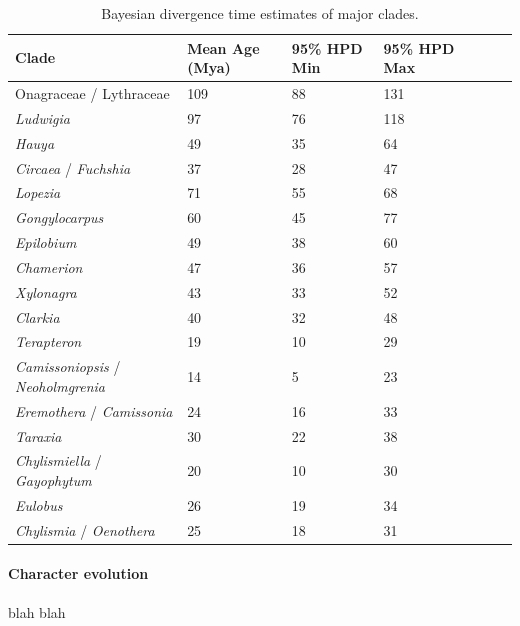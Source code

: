 \documentclass[review]{elsarticle}
\begin{document}
\begin{table}
   \center
   \begin{adjustbox}{max width=\textwidth}
      \begin{tabular}{lllllll}
         \toprule
         Clade & Mean Age (Mya) & 95\% HPD Min & 95\% HPD Max \\ 
	 \midrule
         Onagraceae / Lythraceae & 109 & 88 & 131 \\
         \textit{Ludwigia} & 97 & 76 & 118 \\
	 \textit{Hauya} & 49 & 35 & 64 \\
	 \textit{Circaea} / \textit{Fuchshia} & 37 & 28 & 47 \\
	 \textit{Lopezia} & 71 & 55 & 68 \\
	 \textit{Gongylocarpus} & 60 & 45 & 77 \\
	 \textit{Epilobium} & 49 & 38 & 60 \\
	 \textit{Chamerion} & 47 & 36 & 57 \\
	 \textit{Xylonagra} & 43 & 33 & 52 \\
	 \textit{Clarkia} & 40 & 32 & 48 \\
         \textit{Terapteron} & 19 & 10 & 29 \\
	 \textit{Camissoniopsis} / \textit{Neoholmgrenia} & 14 & 5 & 23 \\
	 \textit{Eremothera} / \textit{Camissonia} & 24 & 16 & 33 \\
	 \textit{Taraxia} & 30 & 22 & 38 \\
	 \textit{Chylismiella} / \textit{Gayophytum} & 20 & 10 & 30 \\
	 \textit{Eulobus} & 26 & 19 & 34 \\
	 \textit{Chylismia} / \textit{Oenothera} & 25 & 18 & 31 \\
         \bottomrule
      \end{tabular}
   \end{adjustbox}
   \caption{Bayesian divergence time estimates of major clades.}
   \label{times}
\end{table}

\paragraph{Character evolution}
blah blah
\end{document}

